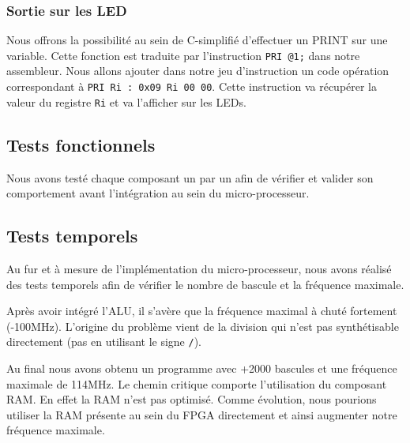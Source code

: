 \subsubsection{Sortie sur les LED}\label{led}
Nous offrons la possibilité au sein de C-simplifié d'effectuer un PRINT sur une variable. Cette fonction est traduite par l'instruction \texttt{PRI @1;} dans notre assembleur. Nous allons ajouter dans notre jeu d'instruction un code opération correspondant à \texttt{PRI Ri : 0x09 Ri 00 00}. Cette instruction va récupérer la valeur du registre \texttt{Ri} et va l'afficher sur les LEDs.

\subsection{Tests fonctionnels}
Nous avons testé chaque composant un par un afin de vérifier et valider son comportement avant l'intégration au sein du micro-processeur. 

\subsection{Tests temporels}
Au fur et à mesure de l'implémentation du micro-processeur, nous avons réalisé des tests temporels afin de vérifier le nombre de bascule et la fréquence maximale. 

Après avoir intégré l'ALU, il s'avère que la fréquence maximal à chuté fortement (-100MHz). L'origine du problème vient de la division qui n'est pas synthétisable directement (pas en utilisant le signe \texttt{/}). 

Au final nous avons obtenu un programme avec +2000 bascules et une fréquence maximale de 114MHz. Le chemin critique comporte l'utilisation du composant RAM. En effet la RAM n'est pas optimisé. Comme évolution, nous pourions utiliser la RAM présente au sein du FPGA directement et ainsi augmenter notre fréquence maximale.
